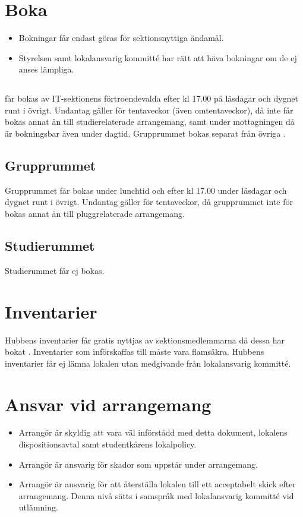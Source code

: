 \documentclass[11pt, includeaddress]{../../classes/cthit}
\begin{document}
\section{Boka}

\begin{itemize}
\item Bokningar får endast göras för sektionsnyttiga ändamål.
\item Styrelsen samt lokalansvarig kommitté har rätt att häva bokningar om de ej anses lämpliga. 
\end{itemize}

\subsection{\HUBBEN{}}
\HUBBEN{} får bokas av IT-­sektionens förtroendevalda efter kl 17.00 på läsdagar och dygnet runt i övrigt. Undantag gäller för tentaveckor (även omtentaveckor), då \HUBBEN{} inte får bokas annat än till studierelaterade arrangemang, samt under mottagningen då \HUBBEN{} är bokningsbar även under dagtid. Grupprummet bokas separat från övriga \HUBBEN{}. 

\subsection{Grupprummet}
Grupprummet får bokas under lunchtid och efter kl 17.00 under läsdagar och dygnet runt i övrigt. Undantag gäller för tentaveckor, då grupprummet inte för bokas annat än till pluggrelaterade arrangemang.

\subsection{Studierummet}
Studierummet får ej bokas.

\section{Inventarier}
Hubbens inventarier får gratis nyttjas av sektionsmedlemmarna då dessa har bokat \HUBBEN{}. Inventarier som införskaffas till \HUBBEN{} måste vara flamsäkra. Hubbens inventarier får ej lämna lokalen utan medgivande från lokalansvarig kommitté.

\section{Ansvar vid arrangemang}
\begin{itemize}
	\item Arrangör är skyldig att vara väl införstådd med detta dokument, lokalens dispositionsavtal samt studentkårens lokalpolicy. 
	\item Arrangör är ansvarig för skador som uppstår under arrangemang. 
	\item Arrangör är ansvarig för att återställa lokalen till ett acceptabelt skick efter arrangemang. Denna nivå sätts i samspråk med lokalansvarig kommitté vid utlämning.
\end{itemize}
\end{document}
